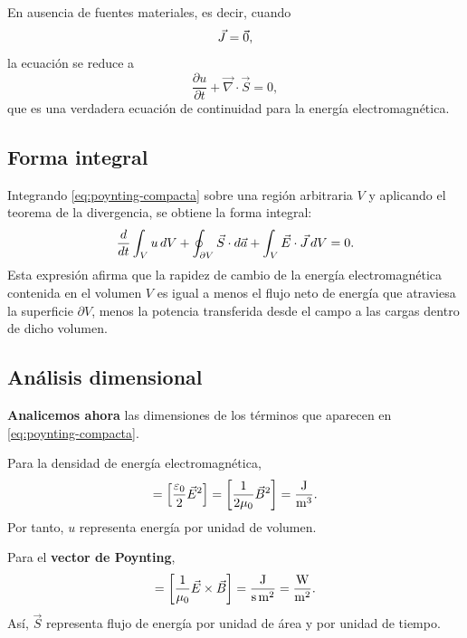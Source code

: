 \documentclass[../main.tex]{subfiles}
\begin{document}
En ausencia de fuentes materiales, es decir, cuando
\begin{equation*}
    \vec{J}=\vec 0,
\end{equation*}
la ecuación se reduce a
\begin{equation*}
    \frac{\partial u}{\partial t}+\vec\nabla\cdot\vec S=0,
\end{equation*}
que es una verdadera ecuación de continuidad para la energía electromagnética.

\subsection*{Forma integral}

Integrando \eqref{eq:poynting-compacta} sobre una región arbitraria $V$ y aplicando el teorema de la divergencia, se obtiene la forma integral:
\begin{equation*}
    \frac{d}{dt}\int_V u\,dV
    +
    \oint_{\partial V}\vec S\cdot d\vec a
    +
    \int_V \vec{E}\cdot\vec{J}\,dV=0.
\end{equation*}
Esta expresión afirma que la rapidez de cambio de la energía electromagnética contenida en el volumen $V$ es igual a menos el flujo neto de energía que atraviesa la superficie $\partial V$, menos la potencia transferida desde el campo a las cargas dentro de dicho volumen.

\subsection*{Análisis dimensional}

\textbf{Analicemos ahora} las dimensiones de los términos que aparecen en \eqref{eq:poynting-compacta}.

Para la densidad de energía electromagnética,
\begin{equation*}
    [u]
    =
    \left[\frac{\varepsilon_0}{2}\E^2\right]
    =
    \left[\frac{1}{2\mu_0}\B^2\right]
    =
    \frac{\mathrm{J}}{\mathrm{m}^3}.
\end{equation*}
Por tanto, $u$ representa energía por unidad de volumen.

Para el \textbf{vector de Poynting},
\begin{equation*}
    [\vec S]
    =
    \left[\frac{1}{\mu_0}\E\times\B\right]
    =
    \frac{\mathrm{J}}{\mathrm{s}\,\mathrm{m}^2}
    =
    \frac{\mathrm{W}}{\mathrm{m}^2}.
\end{equation*}
Así, $\vec S$ representa flujo de energía por unidad de área y por unidad de tiempo.
\end{document}
